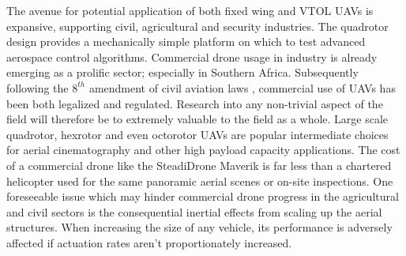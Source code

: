 \par
The avenue for potential application of both fixed wing and VTOL UAVs is expansive, supporting civil\cite{civilquadcopter}, agricultural\cite{agriculturequadcopter} and security\cite{videosurveillancequadcopter} industries. The quadrotor design provides a mechanically simple platform on which to test advanced aerospace control algorithms. Commercial drone usage in industry is already emerging as a prolific sector; especially in Southern Africa. Subsequently following the $8^{th}$ amendment of civil aviation laws \cite{dronelaw}, commercial use of UAVs has been both legalized and regulated. Research into any non-trivial aspect of the field will therefore be to extremely valuable to the field as a whole. Large scale quadrotor, hexrotor and even octorotor UAVs are popular intermediate choices for aerial cinematography and other high payload capacity applications. The cost of a commercial drone like the SteadiDrone Maverik \cite{steadidrone} is far less than a chartered helicopter used for the same panoramic aerial scenes or on-site inspections. One foreseeable issue which may hinder commercial drone progress in the agricultural and civil sectors is the consequential inertial effects from scaling up the aerial structures. When increasing the size of any vehicle, its performance is adversely affected if actuation rates aren't proportionately increased.
